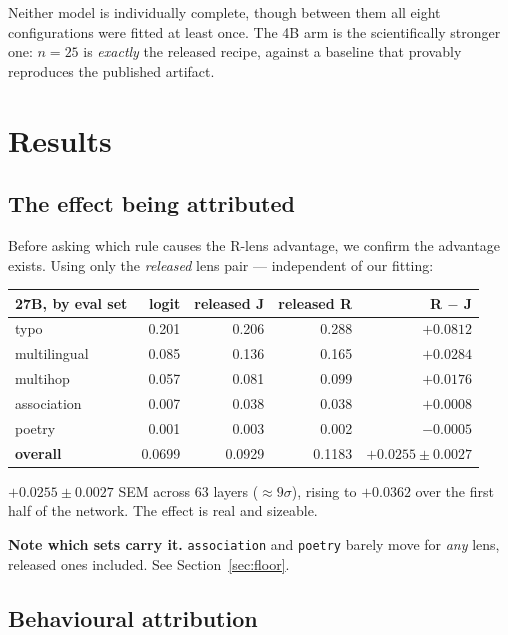 \documentclass[11pt,a4paper]{article}
\newcommand{\rlens}{R\nobreakdash-lens}
\begin{document}
\noindent
Neither model is individually complete, though between them all eight configurations
were fitted at least once. The 4B arm is the scientifically stronger one: $n=25$ is
\emph{exactly} the released recipe, against a baseline that provably reproduces the
published artifact.

\section{Results}

\subsection{The effect being attributed}

Before asking which rule causes the \rlens{} advantage, we confirm the advantage
exists. Using only the \emph{released} lens pair --- independent of our fitting:

\begin{center}
\begin{tabular}{@{}lrrrr@{}}
\toprule
\textbf{27B, by eval set} & \textbf{logit} & \textbf{released J} & \textbf{released R} & \textbf{R $-$ J} \\
\midrule
typo         & 0.201 & 0.206 & 0.288 & $\mathbf{+0.0812}$ \\
multilingual & 0.085 & 0.136 & 0.165 & $\mathbf{+0.0284}$ \\
multihop     & 0.057 & 0.081 & 0.099 & $+0.0176$ \\
association  & 0.007 & 0.038 & 0.038 & $+0.0008$ \\
poetry       & 0.001 & 0.003 & 0.002 & $-0.0005$ \\
\midrule
\textbf{overall} & 0.0699 & 0.0929 & 0.1183 & $\mathbf{+0.0255 \pm 0.0027}$ \\
\bottomrule
\end{tabular}
\end{center}

\noindent
$+0.0255 \pm 0.0027$ SEM across 63 layers ($\approx 9\sigma$), rising to $+0.0362$
over the first half of the network. The effect is real and sizeable.

\textbf{Note which sets carry it.} \texttt{association} and \texttt{poetry} barely
move for \emph{any} lens, released ones included. See
Section~\ref{sec:floor}.

\subsection{Behavioural attribution}
\end{document}
